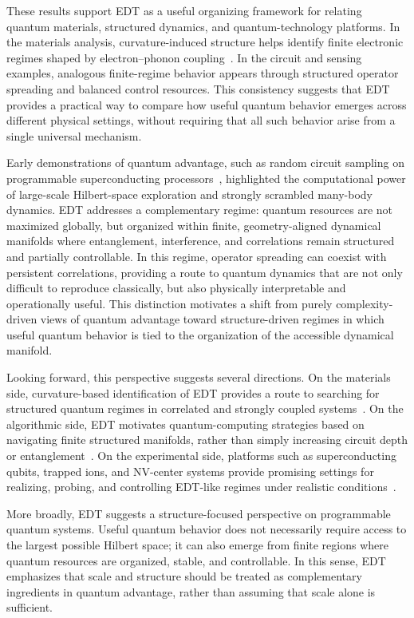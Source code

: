 \documentclass[twocolumn,10pt]{article}
\begin{document}
These results support EDT as a useful organizing framework for relating quantum materials, structured dynamics, and quantum-technology platforms. In the materials analysis, curvature-induced structure helps identify finite electronic regimes shaped by electron--phonon coupling~\cite{BardeenPines1955,Giustino2017}. In the circuit and sensing examples, analogous finite-regime behavior appears through structured operator spreading and balanced control resources. This consistency suggests that EDT provides a practical way to compare how useful quantum behavior emerges across different physical settings, without requiring that all such behavior arise from a single universal mechanism.

Early demonstrations of quantum advantage, such as random circuit sampling on programmable superconducting processors~\cite{Arute2019}, highlighted the computational power of large-scale Hilbert-space exploration and strongly scrambled many-body dynamics. EDT addresses a complementary regime: quantum resources are not maximized globally, but organized within finite, geometry-aligned dynamical manifolds where entanglement, interference, and correlations remain structured and partially controllable. In this regime, operator spreading can coexist with persistent correlations, providing a route to quantum dynamics that are not only difficult to reproduce classically, but also physically interpretable and operationally useful. This distinction motivates a shift from purely complexity-driven views of quantum advantage toward structure-driven regimes in which useful quantum behavior is tied to the organization of the accessible dynamical manifold.

Looking forward, this perspective suggests several directions. On the materials side, curvature-based identification of EDT provides a route to searching for structured quantum regimes in correlated and strongly coupled systems~\cite{Capone2009}. On the algorithmic side, EDT motivates quantum-computing strategies based on navigating finite structured manifolds, rather than simply increasing circuit depth or entanglement~\cite{Preskill2018}. On the experimental side, platforms such as superconducting qubits, trapped ions, and NV-center systems provide promising settings for realizing, probing, and controlling EDT-like regimes under realistic conditions~\cite{Degen2017,Arute2019}.

More broadly, EDT suggests a structure-focused perspective on programmable quantum systems. Useful quantum behavior does not necessarily require access to the largest possible Hilbert space; it can also emerge from finite regions where quantum resources are organized, stable, and controllable. In this sense, EDT emphasizes that scale and structure should be treated as complementary ingredients in quantum advantage, rather than assuming that scale alone is sufficient.
\end{document}
